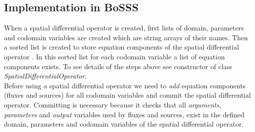 \documentclass[emamy.tex]{subfiles}
\begin{document}
\subsection*{Implementation in BoSSS}
When a spatial differential operator is created, first lists of domain, parameters and codomain variables are created which are string arrays of their names. Then a sorted list is created to store equation components of the spatial differential operator . In this sorted list for each codomain variable a list of equation components exists. To see details of the steps above see constructor of class \emph{SpatialDifferentialOperator}.\\
Before using a spatial differential operator we need to \emph{add} equation components (fluxes and sources) for all codomain variables and commit the spatial differential operator. Committing is necessary because it checks that all \emph{arguments}, \emph{parameters} and \emph{output} variables used by fluxes and sources, exist in the defined domain, parameters and codomain variables of the spatial differential operator.
\end{document}
